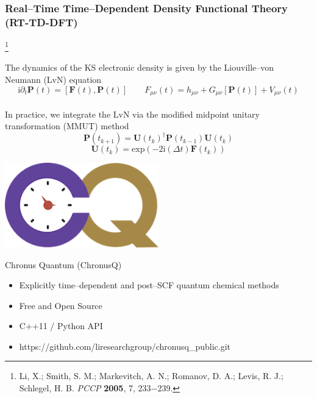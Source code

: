 \documentclass{beamer}
\newcommand{\bpar}[1]{\left( #1 \right)}                  %
\newcommand{\comm}[2]{\left[ #1 , #2\right]}
\renewcommand{\exp}[1]{\mathrm{exp}\bpar{#1}}
\newcommand\blfootnote[1]{%
  \begingroup
  \renewcommand\thefootnote{}\footnote{#1}%
  \addtocounter{footnote}{-1}%
  \endgroup
}
\begin{document}
\begin{frame}
\frametitle{Real--Time Time--Dependent Density Functional Theory (RT-TD-DFT)}
\blfootnote{Li, X.; Smith, S. M.; Markevitch, A. N.; Romanov, D. A.; Levis, R.
J.; Schlegel, H. B. \emph{PCCP} \textbf{2005}, 7, 233−239.}

The dynamics of the KS electronic density is given by the Liouville--von Neumann (LvN) equation
\begin{equation*}
  \mathrm{i}\partial_t\mathbf{P}(t) = \comm{\mathbf{F}(t)}{\mathbf{P}(t)} \qquad F_{\mu\nu}(t) = h_{\mu\nu} + G_{\mu\nu}[\mathbf{P}(t)] + V_{\mu\nu}(t)
\end{equation*}
~\\

In practice, we integrate the LvN via the modified midpoint unitary transformation (MMUT)
method
\begin{equation*}
\mathbf{P}(t_{k+1}) = \mathbf{U}(t_k)^\dagger \mathbf{P}(t_{k-1}) \mathbf{U}(t_k)
\end{equation*}
\begin{equation*}
\mathbf{U}(t_k) = \exp{-2\mathrm{i}(\Delta t) \mathbf{F}(t_k)}
\end{equation*}

\end{frame}

\begin{frame}
\begin{center}
\includegraphics[width=0.5\textwidth]{chronus_quantum_logo}

\LARGE Chronus Quantum (ChronusQ)
\end{center}

\begin{itemize}
  \item Explicitly time--dependent and post--SCF quantum chemical methods
  \item Free and Open Source
  \item C++11 / Python API
  \item https://github.com/liresearchgroup/chronusq\_public.git
\end{itemize}

\end{frame}
\end{document}
